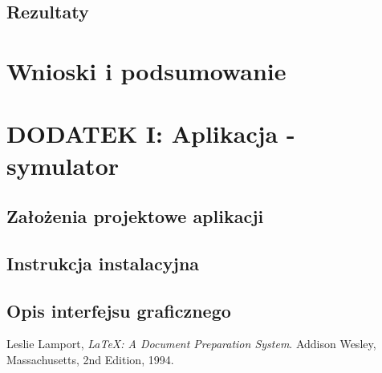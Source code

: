 \documentclass[a4paper,11pt]{article}
\begin{document}
\subsection{Rezultaty}

\newpage
\section{Wnioski i podsumowanie}

\newpage
\section{DODATEK I: Aplikacja - symulator}
\subsection{Założenia projektowe aplikacji}
\subsection{Instrukcja instalacyjna}
\subsection{Opis interfejsu graficznego}
\cite{lamport94}

\newpage
\begin{thebibliography}{9}
  Leslie Lamport,
  \emph{\LaTeX: A Document Preparation System}.
  Addison Wesley, Massachusetts,
  2nd Edition,
  1994.

\end{thebibliography}

\newpage
\listoffigures
{}
\newpage
\lstlistoflistings
{}
\end{document}
